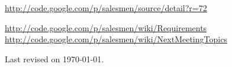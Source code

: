 \documentclass[a4paper, 12pt]{article}
\begin{document}
			
		
	
	
	\begin{thebibliography}{99}
	
		\href{http://code.google.com/p/salesmen/source/detail?r=72}{http://code.google.com/p/salesmen/source/detail?r=72}
		
		\href{http://code.google.com/p/salesmen/wiki/Requirements}{http://code.google.com/p/salesmen/wiki/Requirements}
		\href{http://code.google.com/p/salesmen/wiki/NextMeetingTopics}{http://code.google.com/p/salesmen/wiki/NextMeetingTopics}
		

		

		
	\end{thebibliography}	
	
	\begin{center}
	 	Last revised on \today.
	\end{center}
	
	
\end{document}
